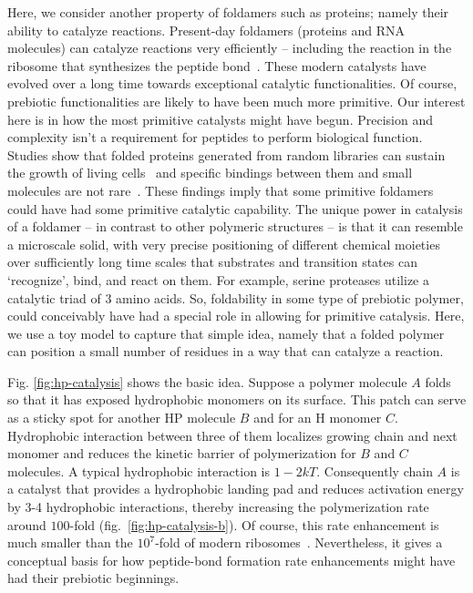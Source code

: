 \documentclass[journal=jacsat,manuscript=article,layout=twocolumn]{achemso}
\begin{document}
Here, we consider another property of foldamers such as proteins; namely their ability 
to catalyze reactions.   Present-day foldamers (proteins and RNA molecules) can catalyze reactions 
very efficiently -- including the reaction in the ribosome that synthesizes the peptide 
bond~\cite{Stachelhaus1998}. These modern catalysts have evolved over a long time towards 
exceptional catalytic functionalities.  Of course, prebiotic functionalities are likely to have been 
much more primitive.  Our interest here is in how the most primitive catalysts might have begun.  
Precision and complexity isn't a requirement for peptides to perform biological function. Studies 
show that folded proteins generated from random libraries can sustain the growth of living 
cells~\cite{Fisher2011} and specific bindings between them and small molecules are not 
rare~\cite{Cherny2012}. These findings imply that some primitive foldamers could have had some 
primitive catalytic capability.  The unique power in catalysis of a foldamer -- in contrast to other 
polymeric structures -- is that it can resemble a microscale solid, with very precise positioning of 
different chemical moieties over sufficiently long time scales that substrates and transition states 
can `recognize', bind, and react on them.  For example, serine proteases utilize a catalytic triad 
of 3 amino acids.  So, foldability in some type of prebiotic polymer, could conceivably have had a 
special role in allowing for primitive catalysis.  Here, we use a toy model to capture that simple 
idea, namely that a folded polymer can position a small number of residues in a way that can 
catalyze a reaction.  

Fig. \ref{fig:hp-catalysis} shows the basic idea.  Suppose a polymer molecule $A$ folds 
so that it has 
exposed hydrophobic monomers on its surface.  This patch can serve as a sticky spot for 
another HP molecule $B$ and for an H monomer $C$.  Hydrophobic interaction between three of them 
localizes growing chain and next monomer and reduces the kinetic barrier of polymerization for $B$ 
and $C$ molecules.  A typical hydrophobic 
interaction is $1-2kT$.  Consequently chain $A$ is a catalyst that provides a hydrophobic 
landing pad and reduces activation energy by 3-4 hydrophobic interactions, thereby increasing the 
polymerization rate around $ 100$-fold (fig.~\ref{fig:hp-catalysis-b}).  Of course, this rate 
enhancement is much smaller than the $10^7$-fold of modern 
ribosomes~\cite{Sievers2004a}. Nevertheless, it gives a conceptual basis for how peptide-bond 
formation rate enhancements might have had their prebiotic beginnings.
\end{document}

